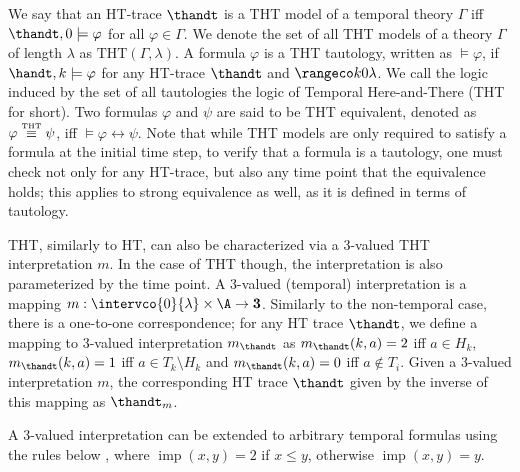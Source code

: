 We say that an HT-trace $\thandt$ is a THT model of a temporal theory
$\Gamma$ iff $\thandt,0 \models \varphi$ for all $\varphi \in
\Gamma$. We denote the set of all THT models of a theory $\Gamma$ of
length $\lambda$ as $\text{THT}(\Gamma,\lambda)$. A formula $\varphi$
is a THT tautology, written as $\models \varphi$, if
$\handt,k \models \varphi$ for any HT-trace $\thandt$ and
$\kinlambda$. We call the logic induced by the set of all tautologies
the logic of Temporal Here-and-There (THT for short). Two formulas
$\varphi$ and $\psi$ are said to be THT equivalent, denoted as
$\varphi \stackrel{\normalfont\mbox{\tiny THT}}{\equiv} \psi$, iff $\models \varphi \leftrightarrow
\psi$. Note that while THT models are only required to satisfy a
formula at the initial time step, to verify that a formula is a
tautology, one must check not only for any HT-trace, but also any time
point that the equivalence holds; this applies to strong equivalence
as well, as it is defined in terms of tautology.

THT, similarly to HT, can also be characterized via a 3-valued THT
interpretation $m$. In the case of THT though, the interpretation is
also parameterized by the time point. A 3-valued (temporal)
interpretation is a mapping
$m: \intervco{0}{\lambda} \times \A \rightarrow \textbf{3}$. Similarly
to the non-temporal case, there is a one-to-one correspondence; for
any HT trace $\thandt$, we define a mapping to 3-valued interpretation
$m_{\thandt}$ as $m_{\thandt}(k,a)=2$ iff $a \in H_k$,
$m_{\thandt}(k,a)=1$ iff $a \in T_k \setminus H_k$ and
$m_{\thandt}(k,a)=0$ iff $a \not\in T_i$. Given a 3-valued
interpretation $m$, the corresponding HT trace $\thandt$ given by the
inverse of this mapping as $\thandt_m$.

A 3-valued interpretation can be extended to arbitrary temporal
formulas using the rules below \cite{agcadipescscvi20a}, where
$\operatorname{imp}(x,y)=2$ if $x \leq y$, otherwise
$\operatorname{imp}(x,y)=y$.

